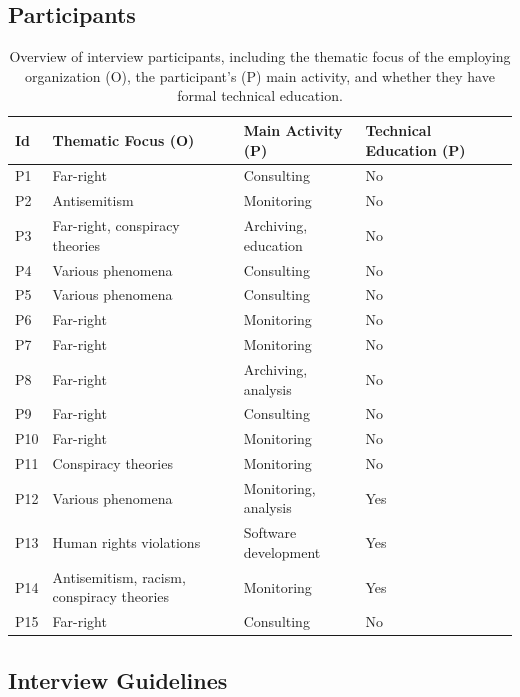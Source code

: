 \documentclass[acmsmall]{acmart}
\begin{document}
\subsection{Participants}

\begin{table}[h!]
        \caption{Overview of interview participants, including the thematic focus of the employing organization (O), the participant's (P) main activity, and whether they have formal technical education.}
    \label{tab:participants_detail}
    \centering
    \small
    \begin{tabular}{|l|l|l|l|l|}
    \hline
       \textbf{Id} & \textbf{Thematic Focus (O)} & \textbf{Main Activity (P)} & \textbf{Technical Education (P)} \\ \hline
        P1 & Far-right & Consulting & No \\ \hline
        P2 & Antisemitism & Monitoring & No \\ \hline
        P3 & Far-right, conspiracy theories & Archiving, education & No \\ \hline
        P4 & Various phenomena & Consulting & No \\ \hline
        P5 & Various phenomena & Consulting & No \\ \hline
        P6 & Far-right & Monitoring & No \\ \hline
        P7 & Far-right & Monitoring & No \\ \hline
        P8 & Far-right & Archiving, analysis & No \\ \hline
        P9 & Far-right & Consulting & No \\ \hline
        P10 & Far-right & Monitoring  & No \\ \hline
        P11 & Conspiracy theories & Monitoring & No \\ \hline
        P12 & Various phenomena & Monitoring, analysis & Yes \\ \hline
        P13 & Human rights violations & Software development & Yes \\ \hline
        P14 & Antisemitism, racism, conspiracy theories & Monitoring & Yes \\ \hline
        P15 & Far-right & Consulting & No \\ \hline
    \end{tabular}
\end{table}

\subsection{Interview Guidelines}
\label{ssec:interview_guidelines}
\end{document}
